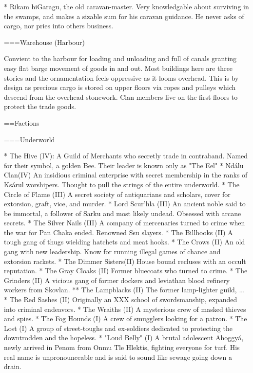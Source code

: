 * Rikam hiGaragu, the old caravan-master. Very knowledgable about surviving in the swamps, and makes a sizable sum for his caravan guidance. He never asks of cargo, nor pries into others business.


===Warehouse (Harbour)

Convient to the harbour for loading and unloading and full of canals granting easy flat barge movement of goods in and out. Most buildings here are three stories and the ornamentation feels oppressive as it looms overhead. This is by design as precious cargo is stored on upper floors via ropes and pulleys which descend from the overhead stonework. Clan members live on the first floors to protect the trade goods.

==Factions

===Underworld

* The Hive (IV): A Guild of Merchants who secretly trade in contraband. Named for their symbol, a golden Bee. Their leader is known only as "The Eel"
* Ndálu Clan(IV) An insidious criminal enterprise with secret membership in the ranks of Ksárul worshipers. Thought to pull the strings of the entire underworld. 
* The Circle of Flame (III) A secret society of antiquarians and scholars, cover for extorsion, graft, vice, and murder.
* Lord Scur'hla (III) An ancient noble said to be immortal, a follower of Sarku and most likely undead. Obsessed with arcane secrets.
* The Silver Nails (III) A company of mercenaries turned to crime when the war for Pan Chaka ended. Renowned Ssu slayers. 
* The Billhooks (II) A tough gang of thugs wielding hatchets and meat hooks.
* The Crows (II) An old gang with new leadership. Know for running illegal games of chance and extorsion rackets. 
* The Dimmer Sisters(II) House bound recluses with an occult reputation.
* The Gray Cloaks (II) Former bluecoats who turned to crime.
* The Grinders (II) A vicious gang of former dockers and leviathan blood refinery workers from Skovlan.
** The Lampblacks (II) The former lamp-lighter guild, ...
* The Red Sashes (II) Originally an XXX school of swordsmanship, expanded into criminal endeavors.
* The Wraiths (II) A mysterious crew of masked thieves and spies.
* The Fog Hounds (I) A crew of smugglers looking for a patron.
* The Lost (I) A group of street-toughs and ex-soldiers dedicated to protecting the downtrodden and the hopeless.
* "Loud Belly" (I) A brutal adolescent Ahoggyá, newly arrived in Penom from Onmu Tle Hlektis, fighting everyone for turf. His real name is unpronounceable and is said to sound like sewage going down a drain.

